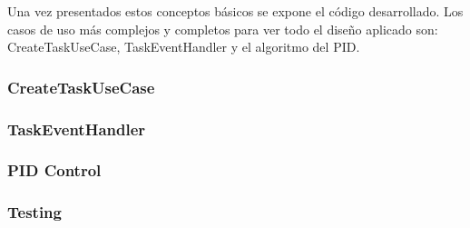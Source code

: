 Una vez presentados estos conceptos básicos se expone el código desarrollado.
Los casos de uso más complejos y completos para ver todo el diseño aplicado son: CreateTaskUseCase, TaskEventHandler y el algoritmo del PID\@.

\subsubsection{CreateTaskUseCase}\label{subsubsec:CreateTaskUseCase}


\subsubsection{TaskEventHandler}


\subsubsection{PID Control}\label{subsubsec:pidControl}


\subsubsection{Testing}



